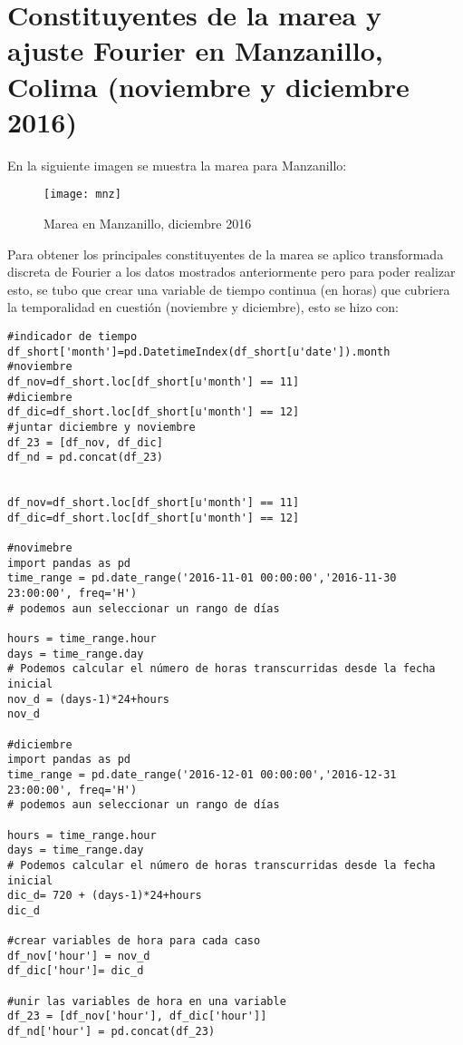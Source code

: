 \documentclass[12pt,letterpaper]{article}
\begin{document}
\section{Constituyentes de la marea y ajuste Fourier en Manzanillo, Colima (noviembre y diciembre 2016)}

En la siguiente imagen se muestra la marea para Manzanillo:

\begin{figure}[H]
	\centering	\texttt{[image: mnz]}
	\caption{Marea en Manzanillo, diciembre 2016}
\end{figure}

Para obtener los principales constituyentes de la marea se aplico transformada discreta de Fourier a los datos mostrados anteriormente pero para poder realizar esto, se tubo que crear una variable de tiempo continua (en horas) que cubriera la temporalidad en cuestión (noviembre y diciembre), esto se hizo con:

\begin{verbatim}
#indicador de tiempo
df_short['month']=pd.DatetimeIndex(df_short[u'date']).month
#noviembre
df_nov=df_short.loc[df_short[u'month'] == 11]
#diciembre
df_dic=df_short.loc[df_short[u'month'] == 12]
#juntar diciembre y noviembre
df_23 = [df_nov, df_dic]
df_nd = pd.concat(df_23)


df_nov=df_short.loc[df_short[u'month'] == 11]
df_dic=df_short.loc[df_short[u'month'] == 12]

#novimebre
import pandas as pd
time_range = pd.date_range('2016-11-01 00:00:00','2016-11-30 23:00:00', freq='H')
# podemos aun seleccionar un rango de días
 
hours = time_range.hour
days = time_range.day
# Podemos calcular el número de horas transcurridas desde la fecha inicial
nov_d = (days-1)*24+hours
nov_d

#diciembre
import pandas as pd
time_range = pd.date_range('2016-12-01 00:00:00','2016-12-31 23:00:00', freq='H')
# podemos aun seleccionar un rango de días
 
hours = time_range.hour
days = time_range.day
# Podemos calcular el número de horas transcurridas desde la fecha inicial
dic_d= 720 + (days-1)*24+hours
dic_d

#crear variables de hora para cada caso
df_nov['hour'] = nov_d
df_dic['hour']= dic_d

#unir las variables de hora en una variable
df_23 = [df_nov['hour'], df_dic['hour']]
df_nd['hour'] = pd.concat(df_23)

\end{verbatim}
\end{document}
